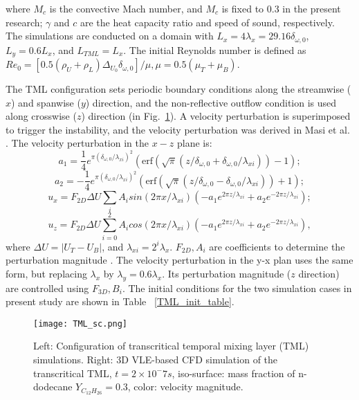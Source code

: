 where $M_c$ is the convective Mach number, and $M_c$ is fixed to 0.3 in the present research; $\gamma$ and $c$ are the heat capacity ratio and speed of sound, respectively. 
The simulations are conducted on a domain with $L_x = 4 \lambda_x = 29.16 \delta_{\omega,0}$, $L_y = 0.6 L_x$, and $L_{TML}=L_x$. 
The initial Reynolds number is defined as $Re_0 = [0.5(\rho_U +\rho_L)\Delta_{U_0} \delta_{\omega,0}]/\mu,\mu = 0.5 (\mu_T+\mu_B)$.

The TML configuration sets periodic boundary conditions along the streamwise ($x$) and spanwise ($y$) direction, and the non-reflective outflow condition is used along crosswise ($z$) direction (in Fig.~\ref{TML_GEO}). A velocity perturbation is superimposed to trigger the instability, and the velocity perturbation was derived in Masi et al. \cite{masi2013multi}. The velocity perturbation in the $x-z$ plane is:
$$ a_1 = \frac{1}{4} e^{\pi (\delta_{\omega,0}/ \lambda_{xi})^2}(\textrm{erf}(\sqrt{\pi}(z/\delta_{\omega,0}+ \delta_{\omega,0}/\lambda_{xi}))-1);$$
$$ a_2 = -\frac{1}{4} e^{\pi (\delta_{\omega,0}/ \lambda_{xi})^2}(\textrm{erf}(\sqrt{\pi}(z/\delta_{\omega,0}- \delta_{\omega,0}/\lambda_{xi}))+1);$$
$$u_x = F_{2D} \Delta U \sum_i A_i sin(2\pi x/ \lambda_{xi}) (-a_1 e^{2\pi z / \lambda_{xi}}+a_2 e^{- 2\pi z / \lambda_{xi}});$$
$$u_z= F_{2D} \Delta U \sum_{i=0}^{2} A_i cos(2\pi x/ \lambda_{xi}) (-a_1 e^{2\pi z / \lambda_{xi}}+a_2 e^{- 2\pi z / \lambda_{xi}}),$$
where $\Delta U = |U_T-U_B|$, and $\lambda_{xi}=2^i\lambda_x$. $F_{2D}, A_i$ are coefficients to determine the perturbation magnitude \cite{masi2013multi}. The velocity perturbation in the y-x plan uses the same form, but replacing $\lambda_x$ by $\lambda_y = 0.6 \lambda_x$. Its perturbation magnitude ($z$ direction) are controlled using $F_{3D}, B_i$. The initial conditions for the two simulation cases in present study are shown in Table ~\ref{TML_init_table}.

\begin{figure}[htbp]
\centering

\texttt{[image: TML\_sc.png]}
\hspace{.2in}
\caption{Left: Configuration of transcritical temporal mixing layer (TML) simulations. Right: 3D VLE-based CFD simulation of the transcritical TML, $t=2\times 10^-7s$, iso-surface: mass fraction of n-dodecane $Y_{C_{12}H_{26}} = 0.3$, color: velocity magnitude.}
\label{TML_GEO} 
\end{figure}



